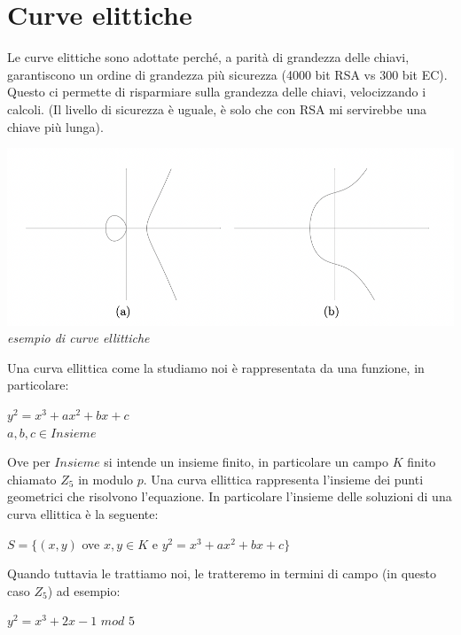 \documentclass[11pt, oneside]{article}   	%
\begin{document}
\section*{Curve elittiche}
Le curve elittiche sono adottate perché, a parità di grandezza delle chiavi, garantiscono un ordine di grandezza più sicurezza (4000 bit RSA vs 300 bit EC). Questo ci permette di risparmiare sulla grandezza delle chiavi, velocizzando i calcoli. (Il livello di sicurezza è uguale, è solo che con RSA mi servirebbe una chiave più lunga).

\begin{center}
\includegraphics[scale= 0.6]{curves}\\
\emph{esempio di curve ellittiche}
\end{center}
Una curva ellittica come la studiamo noi è rappresentata da una funzione, in particolare:
\begin{center}
$y^2 = x^3 + ax^2 + bx + c$\\
$a, b, c \in Insieme$
\end{center}
Ove per $Insieme$ si intende un insieme finito, in particolare un campo $K$ finito chiamato $Z_5$ in modulo $p$. Una curva ellittica rappresenta l'insieme dei punti geometrici che risolvono l'equazione.
In particolare l'insieme delle soluzioni di una curva ellittica è la seguente:
\begin{center}
$S = \{(x,y)$ ove $x, y \in K$ e $y^2 = x^3 + ax^2 + bx + c\}$
\end{center}
Quando tuttavia le trattiamo noi, le tratteremo in termini di campo (in questo caso $Z_5$) ad esempio:
\begin{center}
$y^2 = x^3 + 2x -1$ $mod$ $5$
\end{center}
\end{document}
